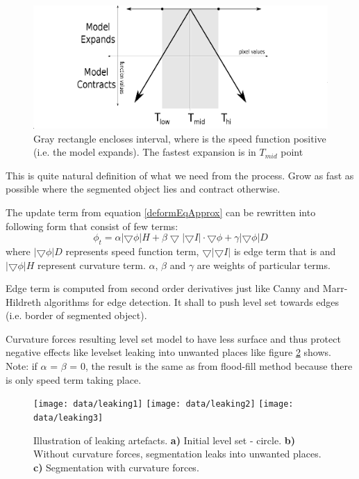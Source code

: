 \begin{figure}
    \centering
    \includegraphics[width=\textwidth]{data/speedFunction}
    \caption[Graph of thresholding based speed function]{Gray rectangle encloses interval, where is the speed function positive (i.e. the model expands). The fastest expansion is in $T_{mid}$ point}
    \label{fg:speedFunction}
\end{figure}

This is quite natural definition of what we need from the process.
Grow as fast as possible where the segmented object lies and contract otherwise.

The update term from equation \ref{deformEqApprox} can be rewritten into following form that consist of few terms:
\begin{equation}
\phi_t = \alpha |\bigtriangledown \phi| H + \beta
\bigtriangledown|\bigtriangledown I|\cdot \bigtriangledown \phi +
\gamma|\bigtriangledown \phi|D
\end{equation}
where $|\bigtriangledown \phi|D$ represents speed function term, $\bigtriangledown|\bigtriangledown I|$ is edge term that is and $|\bigtriangledown \phi| H$ represent curvature term. $\alpha$, $\beta$ and $\gamma$ are weights of particular terms.

Edge term is computed from second order derivatives just like Canny and Marr-Hildreth algorithms for edge detection.
It shall to push level set towards edges (i.e. border of segmented object).

Curvature forces resulting level set model to have less surface and thus protect negative effects like levelset leaking into unwanted places like figure \ref{fg:leaking} shows.
Note: if $\alpha$ = $\beta$ = 0, the result is the same as from flood-fill method because there is only speed term taking place.

\begin{figure}
    \centering
    \texttt{[image: data/leaking1]}
    \texttt{[image: data/leaking2]}
    \texttt{[image: data/leaking3]}
    \caption[Leaking]{Illustration of leaking artefacts.
    \textbf{a)} Initial level set - circle.
    \textbf{b)} Without curvature forces, segmentation leaks into unwanted places.
    \textbf{c)} Segmentation with curvature forces.
}
    \label{fg:leaking}
\end{figure}

